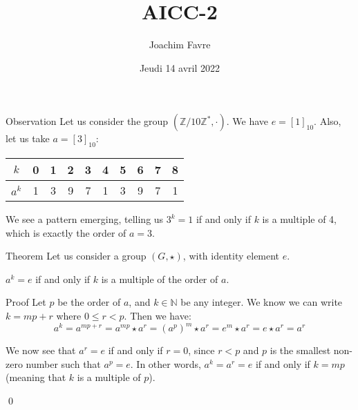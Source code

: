 \documentclass[a4paper]{article}
\title{AICC-2}
\author{Joachim Favre}
\date{Jeudi 14 avril 2022}
\begin{document}
\maketitle


\begin{parag}{Observation}
    Let us consider the group $\left(\mathbb{Z} / 10\mathbb{Z}^*, \cdot\right)$. We have $e = \left[1\right]_{10}$. Also, let us take $a = \left[3\right]_{10}$:
    \begin{center}
    \begin{tabular}{c|ccccccccc}
        $k$ & 0 & 1 & 2 & 3 & 4 & 5 & 6 & 7 & 8 \\
        \hline
        $a^k$ & 1 & 3 & 9 & 7 &  1 & 3 & 9 & 7 & 1
    \end{tabular}
    \end{center}

    We see a pattern emerging, telling us $3^k = 1$ if and only if $k$ is a multiple of 4, which is exactly the order of $a = 3$.
\end{parag}

\begin{parag}{Theorem}
    Let us consider a group $\left(G, \star\right)$, with identity element $e$.

    $a^k = e$ if and only if $k$ is a multiple of the order of $a$.


    \begin{subparag}{Proof}
        Let $p$ be the order of $a$, and $k \in \mathbb{N}$ be any integer. We know we can write $k = mp + r$ where $0 \leq r < p$. Then we have:
        \[a^k = a^{mp + r} = a^{mp} \star a^{r} = \left(a^p\right)^m \star a^r = e^m \star a^r = e \star a^r = a^r\]

        We now see that $a^r = e$ if and only if $r = 0$, since $r < p$ and $p$ is the smallest non-zero number such that $a^p = e$. In other words, $a^k = a^r = e$ if and only if $k = mp$ (meaning that $k$ is a multiple of $p$).

        \qed
    \end{subparag}
\end{parag}
\end{document}
